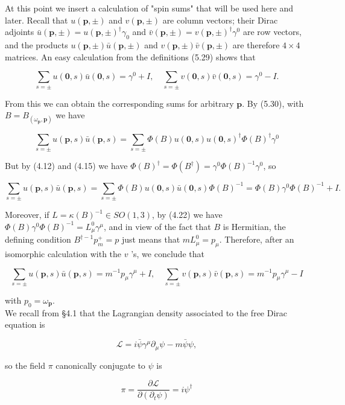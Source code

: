 \documentclass[10pt, letterpaper]{article}
\begin{document}
At this point we insert a calculation of "spin sums" that will be used here and later. Recall that $u(\mathbf{p}, \pm)$ and $v(\mathbf{p}, \pm)$ are column vectors; their Dirac adjoints $\bar{u}(\mathbf{p}, \pm)=u(\mathbf{p}, \pm)^{\dagger} \gamma_{0}$ and $\bar{v}(\mathbf{p}, \pm)=v(\mathbf{p}, \pm)^{\dagger} \gamma^{0}$ are row vectors, and the products $u(\mathbf{p}, \pm) \bar{u}(\mathbf{p}, \pm)$ and $v(\mathbf{p}, \pm) \bar{v}(\mathbf{p}, \pm)$ are therefore $4 \times 4$ matrices. An easy calculation from the definitions (5.29) shows that

$$
\sum_{s= \pm} u(\mathbf{0}, s) \bar{u}(\mathbf{0}, s)=\gamma^{0}+I, \quad \sum_{s= \pm} v(\mathbf{0}, s) \bar{v}(\mathbf{0}, s)=\gamma^{0}-I .
$$

From this we can obtain the corresponding sums for arbitrary $\mathbf{p}$. By (5.30), with $B=B_{\left(\omega_{\mathbf{p}}, \mathbf{p}\right)}$ we have

$$
\sum_{s= \pm} u(\mathbf{p}, s) \bar{u}(\mathbf{p}, s)=\sum_{s= \pm} \Phi(B) u(\mathbf{0}, s) u(\mathbf{0}, s)^{\dagger} \Phi(B)^{\dagger} \gamma^{0}
$$

But by (4.12) and (4.15) we have $\Phi(B)^{\dagger}=\Phi\left(B^{\dagger}\right)=\gamma^{0} \Phi(B)^{-1} \gamma^{0}$, so

$$
\sum_{s= \pm} u(\mathbf{p}, s) \bar{u}(\mathbf{p}, s)=\sum_{s= \pm} \Phi(B) u(\mathbf{0}, s) \bar{u}(\mathbf{0}, s) \Phi(B)^{-1}=\Phi(B) \gamma^{0} \Phi(B)^{-1}+I .
$$

Moreover, if $L=\kappa(B)^{-1} \in S O(1,3)$, by (4.22) we have $\Phi(B) \gamma^{0} \Phi(B)^{-1}=L_{\mu}^{0} \gamma^{\mu}$, and in view of the fact that $B$ is Hermitian, the defining condition $B^{\dagger-1} p_{m}^{+}=p$ just means that $m L_{\mu}^{0}=p_{\mu}$. Therefore, after an isomorphic calculation with the $v$ 's, we conclude that

$$
\sum_{s= \pm} u(\mathbf{p}, s) \bar{u}(\mathbf{p}, s)=m^{-1} p_{\mu} \gamma^{\mu}+I, \quad \sum_{s= \pm} v(\mathbf{p}, s) \bar{v}(\mathbf{p}, s)=m^{-1} p_{\mu} \gamma^{\mu}-I
$$

with $p_{0}=\omega_{\mathbf{p}}$.\\
We recall from §4.1 that the Lagrangian density associated to the free Dirac equation is

$$
\mathcal{L}=i \bar{\psi} \gamma^{\mu} \partial_{\mu} \psi-m \bar{\psi} \psi,
$$

so the field $\pi$ canonically conjugate to $\psi$ is

$$
\pi=\frac{\partial \mathcal{L}}{\partial\left(\partial_{t} \psi\right)}=i \psi^{\dagger}
$$
\end{document}
